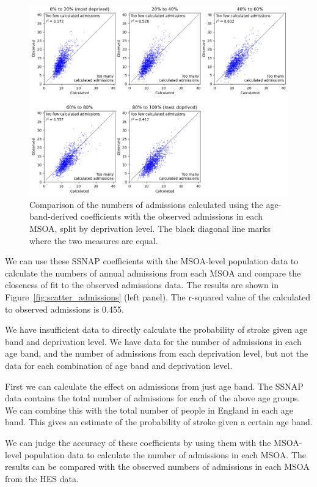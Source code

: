 \documentclass[12pt]{extarticle}
\begin{document}
\begin{figure}
    \centering
    \includegraphics[width=1.0\linewidth]{images/scatter_admissions_from_ssnap_coeffs_separate.png}
    \caption{Comparison of the numbers of admissions calculated using the age-band-derived coefficients with the observed admissions in each MSOA, split by deprivation level. The black diagonal line marks where the two measures are equal.}
    \label{fig:scatter_admissions_from_ssnap_coeffs_separate}
\end{figure}

We can use these SSNAP coefficients with the MSOA-level population data to calculate the numbers of annual admissions from each MSOA and compare the closeness of fit to the observed admissions data.
The results are shown in Figure~\ref{fig:scatter_admissions} (left panel). The r-squared value of the calculated to observed admissions is 0.455. 


We have insufficient data to directly calculate the probability of stroke given age band and deprivation level. We have data for the number of admissions in each age band, and the number of admissions from each deprivation level, but not the data for each combination of age band and deprivation level.

First we can calculate the effect on admissions from just age band.
The SSNAP data contains the total number of admissions for each of the above age groups. We can combine this with the total number of people in England in each age band. This gives an estimate of the probability of stroke given a certain age band.


We can judge the accuracy of these coefficients by using them with the MSOA-level population data to calculate the number of admissions in each MSOA.
The results can be compared with the observed numbers of admissions in each MSOA from the HES data.
\end{document}
